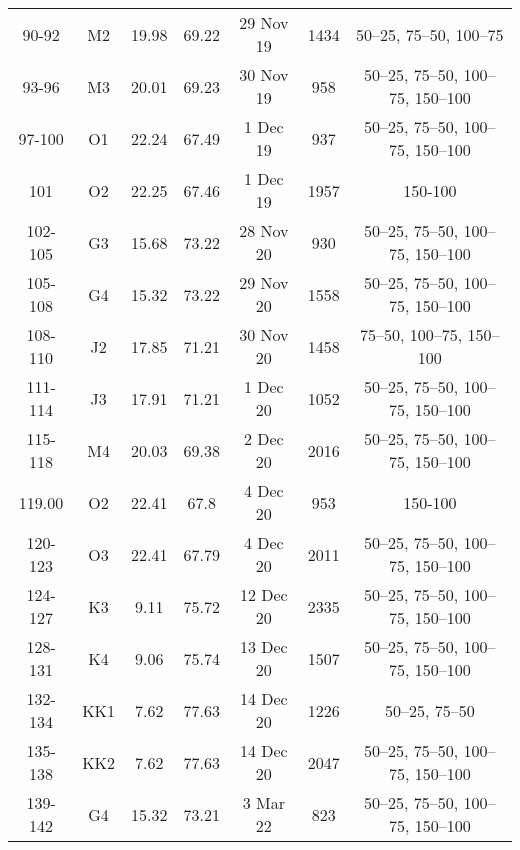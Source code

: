 \documentclass{article}
\begin{document}
\begin{table}[htbp]
{\begin{adjustwidth}{0in}{0in}
\begin{tabular}{ccccccc}
				90-92         & M2  & 19.98      & 69.22      & 29 Nov 19                 & 1434       & 50–25, 75–50, 100–75          \\
				93-96         & M3  & 20.01      & 69.23      & 30 Nov 19                 & 958        & 50–25, 75–50, 100–75, 150–100 \\
				97-100        & O1  & 22.24      & 67.49      & 1 Dec 19                  & 937        & 50–25, 75–50, 100–75, 150–100 \\
				101        & O2  & 22.25      & 67.46      & 1 Dec 19                  & 1957       & 150-100                       \\
				\midrule
				102-105       & G3  & 15.68      & 73.22      & 28 Nov 20                 & 930        & 50–25, 75–50, 100–75, 150–100 \\
				105-108       & G4  & 15.32      & 73.22      & 29 Nov 20                 & 1558       & 50–25, 75–50, 100–75, 150–100 \\
				108-110       & J2  & 17.85      & 71.21      & 30 Nov 20                 & 1458       & 75–50, 100–75, 150–100        \\
				111-114       & J3  & 17.91      & 71.21      & 1 Dec 20                  & 1052       & 50–25, 75–50, 100–75, 150–100 \\
				115-118       & M4  & 20.03      & 69.38      & 2 Dec 20                  & 2016       & 50–25, 75–50, 100–75, 150–100 \\
				119.00        & O2  & 22.41      & 67.8       & 4 Dec 20                  & 953        & 150-100                       \\
				120-123       & O3  & 22.41      & 67.79      & 4 Dec 20                  & 2011       & 50–25, 75–50, 100–75, 150–100 \\
				124-127       & K3  & 9.11       & 75.72      & 12 Dec 20                 & 2335       & 50–25, 75–50, 100–75, 150–100 \\
				128-131       & K4  & 9.06       & 75.74      & 13 Dec 20                 & 1507       & 50–25, 75–50, 100–75, 150–100 \\
				132-134       & KK1 & 7.62       & 77.63      & 14 Dec 20                 & 1226       & 50–25, 75–50                  \\
				135-138       & KK2 & 7.62       & 77.63      & 14 Dec 20                 & 2047       & 50–25, 75–50, 100–75, 150–100 \\
				\midrule
				139-142       & G4  & 15.32      & 73.21      & 3 Mar 22                  & 823        & 50–25, 75–50, 100–75, 150–100 \\

\end{tabular}
\end{adjustwidth}}
\end{table}
\end{document}
